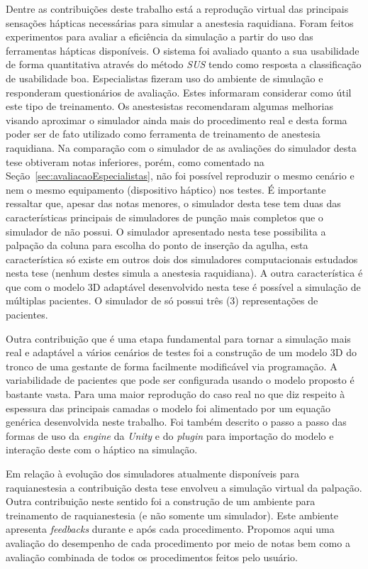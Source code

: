 Dentre as contribuições deste trabalho está a reprodução virtual das principais sensações hápticas necessárias para simular a anestesia raquidiana. Foram feitos experimentos para avaliar a eficiência da simulação a partir do uso das ferramentas hápticas disponíveis. O sistema foi avaliado quanto a sua usabilidade de forma quantitativa através do método \textit{\acrshort{SUS}} \cite{Brooke2013} tendo como resposta a classificação de usabilidade boa. Especialistas fizeram uso do ambiente de simulação e responderam questionários de avaliação. Estes informaram considerar como útil este tipo de treinamento. Os anestesistas recomendaram algumas melhorias visando aproximar o simulador ainda mais do procedimento real e desta forma poder ser de fato utilizado como ferramenta de treinamento de anestesia raquidiana. Na comparação com o simulador de \textcite{Farber2008} as avaliações do simulador desta tese obtiveram notas inferiores, porém, como comentado na Seção~\ref{sec:avaliacaoEspecialistas}, não foi possível reproduzir o mesmo cenário e nem o mesmo equipamento (dispositivo háptico) nos testes. É importante ressaltar que, apesar das notas menores, o simulador desta tese tem duas das características principais de simuladores de punção mais completos que o simulador de \textcite{Farber2008} não possui. O simulador apresentado nesta tese possibilita a palpação da coluna para escolha do ponto de inserção da agulha, esta característica só existe em outros dois dos simuladores computacionais estudados nesta tese (nenhum destes simula a anestesia raquidiana). A outra característica é que com o modelo 3D adaptável desenvolvido nesta tese é possível a simulação de múltiplas pacientes. O simulador de \textcite{Farber2008} só possui três (3) representações de pacientes.

Outra contribuição que é uma etapa fundamental para tornar a simulação mais real e adaptável a vários cenários de testes foi a construção de um modelo 3D do tronco de uma gestante de forma facilmente modificável via programação. A variabilidade de pacientes que pode ser configurada usando o modelo proposto é bastante vasta. Para uma maior reprodução do caso real no que diz respeito à espessura das principais camadas o modelo foi alimentado por um equação genérica desenvolvida neste trabalho. Foi também descrito o passo a passo das formas de uso da \textit{engine} da \textit{Unity} e do \textit{plugin} para importação do modelo e interação deste com o háptico na simulação. 

Em relação à evolução dos simuladores atualmente disponíveis para raquianestesia a contribuição desta tese envolveu a simulação virtual da palpação. Outra contribuição neste sentido foi a construção de um ambiente para treinamento de raquianestesia (e não somente um simulador). Este ambiente apresenta \textit{feedbacks} durante e após cada procedimento. Propomos aqui uma avaliação do desempenho de cada procedimento por meio de notas bem como a avaliação combinada de todos os procedimentos feitos pelo usuário. 

